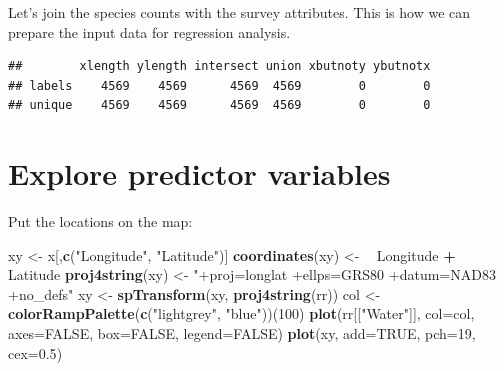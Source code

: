 \documentclass[12pt,]{book}
\newenvironment{Shaded}{\begin{snugshade}}{\end{snugshade}}
\newcommand{\CommentTok}[1]{\textcolor[rgb]{0.56,0.35,0.01}{\textit{#1}}}
\newcommand{\DataTypeTok}[1]{\textcolor[rgb]{0.13,0.29,0.53}{#1}}
\newcommand{\DecValTok}[1]{\textcolor[rgb]{0.00,0.00,0.81}{#1}}
\newcommand{\ErrorTok}[1]{\textcolor[rgb]{0.64,0.00,0.00}{\textbf{#1}}}
\newcommand{\FloatTok}[1]{\textcolor[rgb]{0.00,0.00,0.81}{#1}}
\newcommand{\KeywordTok}[1]{\textcolor[rgb]{0.13,0.29,0.53}{\textbf{#1}}}
\newcommand{\NormalTok}[1]{#1}
\newcommand{\OperatorTok}[1]{\textcolor[rgb]{0.81,0.36,0.00}{\textbf{#1}}}
\newcommand{\OtherTok}[1]{\textcolor[rgb]{0.56,0.35,0.01}{#1}}
\newcommand{\StringTok}[1]{\textcolor[rgb]{0.31,0.60,0.02}{#1}}
\begin{document}
Let's join the species counts with the survey attributes.
This is how we can prepare the input data for regression analysis.

\begin{Shaded}
\end{Shaded}

\begin{verbatim}
##        xlength ylength intersect union xbutnoty ybutnotx
## labels    4569    4569      4569  4569        0        0
## unique    4569    4569      4569  4569        0        0
\end{verbatim}

\begin{Shaded}
\end{Shaded}

\hypertarget{explore-predictor-variables}{%
\section{Explore predictor variables}\label{explore-predictor-variables}}

Put the locations on the map:

\begin{Shaded}
\begin{Highlighting}[]
\NormalTok{xy <-}\StringTok{ }\NormalTok{x[,}\KeywordTok{c}\NormalTok{(}\StringTok{"Longitude"}\NormalTok{, }\StringTok{"Latitude"}\NormalTok{)]}
\KeywordTok{coordinates}\NormalTok{(xy) <-}\StringTok{ }\ErrorTok{~}\StringTok{ }\NormalTok{Longitude }\OperatorTok{+}\StringTok{ }\NormalTok{Latitude}
\KeywordTok{proj4string}\NormalTok{(xy) <-}\StringTok{ "+proj=longlat +ellps=GRS80 +datum=NAD83 +no_defs"}
\NormalTok{xy <-}\StringTok{ }\KeywordTok{spTransform}\NormalTok{(xy, }\KeywordTok{proj4string}\NormalTok{(rr))}
\NormalTok{col <-}\StringTok{ }\KeywordTok{colorRampPalette}\NormalTok{(}\KeywordTok{c}\NormalTok{(}\StringTok{"lightgrey"}\NormalTok{, }\StringTok{"blue"}\NormalTok{))(}\DecValTok{100}\NormalTok{)}
\KeywordTok{plot}\NormalTok{(rr[[}\StringTok{"Water"}\NormalTok{]], }\DataTypeTok{col=}\NormalTok{col, }\DataTypeTok{axes=}\OtherTok{FALSE}\NormalTok{, }\DataTypeTok{box=}\OtherTok{FALSE}\NormalTok{, }\DataTypeTok{legend=}\OtherTok{FALSE}\NormalTok{)}
\KeywordTok{plot}\NormalTok{(xy, }\DataTypeTok{add=}\OtherTok{TRUE}\NormalTok{, }\DataTypeTok{pch=}\DecValTok{19}\NormalTok{, }\DataTypeTok{cex=}\FloatTok{0.5}\NormalTok{)}
\end{Highlighting}
\end{Shaded}
\end{document}
